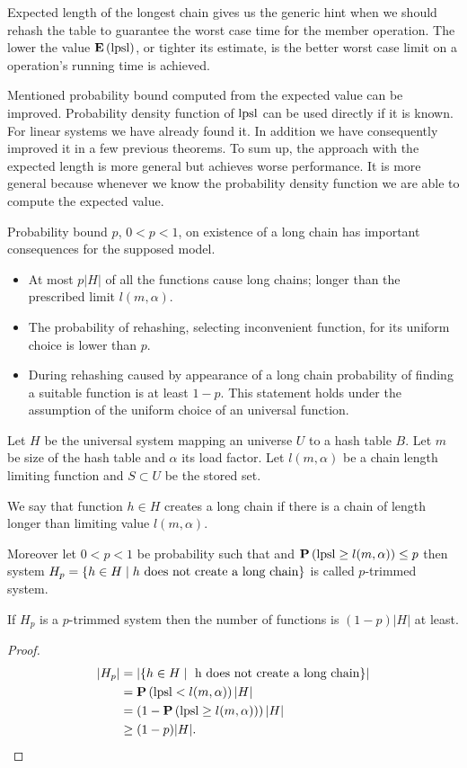 Expected length of the longest chain gives us the generic hint when we should rehash the table to guarantee the worst case time for the member operation. The lower the value $\mathbf{E}\left(\mathrm{lpsl}\right)$, or tighter its estimate, is the better worst case limit on a operation's running time is achieved.

Mentioned probability bound computed from the expected value can be improved. Probability density function of $\mathrm{lpsl}$ can be used directly if it is known. For linear systems we have already found it. In addition we have consequently improved it in a few previous theorems. To sum up, the approach with the expected length is more general but achieves worse performance. It is more general because whenever we know the probability density function we are able to compute the expected value.

Probability bound $p$, $0 < p < 1$, on existence of a long chain has important consequences for the supposed model.
\begin{itemize}
\item At most $p|H|$ of all the functions cause long chains; longer than the prescribed limit $l(m, \alpha)$. 
\item The probability of rehashing, selecting inconvenient function, for its uniform choice is lower than $p$.
\item During rehashing caused by appearance of a long chain probability of finding a suitable function is at least $1 - p$. This statement holds under the assumption of the uniform choice of an universal function.
\end{itemize}

\begin{definition}
Let $H$ be the universal system mapping an universe $U$ to a hash table $B$. Let $m$ be size of the hash table and $\alpha$ its load factor. Let $l(m, \alpha)$ be a chain length limiting function and $S \subset U$ be the stored set. 

We say that function $h \in H$ creates a long chain if there is a chain of length longer than limiting value $l(m, \alpha)$.

Moreover let $0 < p < 1$ be probability such that and $\mathbf{P}\left(\mathrm{lpsl} \geq l(m, \alpha)\right) \leq p$ then system $H_p = \{ h \in H \mid h \text{ does not create a long chain} \}$ is called $p$-trimmed system.
\end{definition}

\begin{lemma}
\label{lemma-size-of-trimmed-system}
If $H_p$ is a $p$-trimmed system then the number of functions is $(1 - p)|H|$ at least.
\end{lemma}
\begin{proof}
\[
\begin{split}
|H_p|
	& = |\lbrace h \in H \mid \text{ h does not create a long chain} \rbrace| \\
	& =\mathbf{P}\left(\mathrm{lpsl} < l(m, \alpha)\right) |H| \\
	& = \left(1 - \mathbf{P}\left(\mathrm{lpsl} \geq l(m, \alpha)\right)\right) |H| \\
	& \geq (1 - p)|H| \text{.}
\end{split}
\]
\end{proof}

